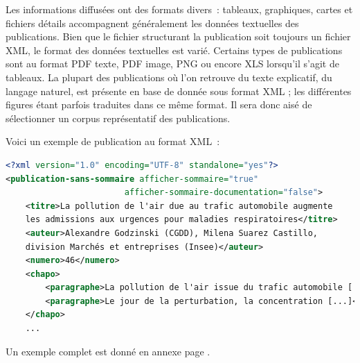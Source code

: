 Les informations diffusées ont des formats divers~: tableaux, graphiques, cartes et fichiers détails accompagnent généralement les données textuelles des publications. Bien que le fichier structurant la publication soit toujours un fichier XML, le format des données textuelles est varié. Certains types de publications sont au format PDF texte, PDF image, PNG ou encore XLS lorsqu'il s'agit de tableaux. La plupart des publications où l'on retrouve du texte explicatif, du langage naturel, est présente en base de donnée sous format XML ; les différentes figures étant parfois traduites dans ce même format. Il sera donc aisé de sélectionner un corpus représentatif des publications. 
\newline

Voici un exemple de publication au format XML~: 

\begin{lstlisting}[language=XML, basicstyle=\small]
<?xml version="1.0" encoding="UTF-8" standalone="yes"?>
<publication-sans-sommaire afficher-sommaire="true"
                        afficher-sommaire-documentation="false">
	<titre>La pollution de l'air due au trafic automobile augmente 
	les admissions aux urgences pour maladies respiratoires</titre>
	<auteur>Alexandre Godzinski (CGDD), Milena Suarez Castillo, 
	division Marchés et entreprises (Insee)</auteur>
	<numero>46</numero>
	<chapo>
		<paragraphe>La pollution de l'air issue du trafic automobile [...]<paragraphe>
		<paragraphe>Le jour de la perturbation, la concentration [...]</paragraphe>
	</chapo>
	...
\end{lstlisting}

Un exemple complet est donné en annexe page \pageref{publication-xml}.
\newline

